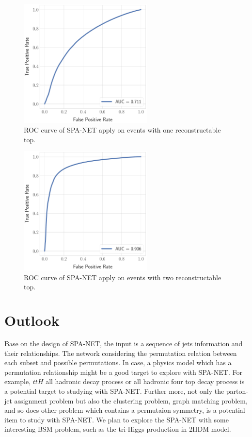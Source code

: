  \begin{figure}[H]
 	\centering
 	\includegraphics[width=0.6\textwidth]{Figures/roc_one_quark.pdf}
 	\caption{ ROC curve of SPA-NET apply on events with one reconstructable top.}
 	\label{fig: roc one top}
 \end{figure}
 \begin{figure}[H]
 	\centering
 	\includegraphics[width=0.6\textwidth]{Figures/roc_two_quark.pdf}
 	\caption{ ROC curve of SPA-NET apply on events with two reconstructable top.}
 	\label{fig: roc two top}
 \end{figure}

\section{Outlook}\label{sec:outlook}

Base on the design of SPA-NET, the input is a sequence of jets information and their relationships. The network considering the permutation relation between each subset and possible permutations. In case, a physics model which has a permutation relationship might be a good target to explore with SPA-NET. For example, $ttH$ all hadronic decay process or all hadronic four top decay process is a potential target to studying with SPA-NET. Further more, not only the parton-jet assignment problem but also the clustering problem, graph matching problem, and so does other problem which contains a permutaion symmetry, is a potential item to study with SPA-NET. We plan to explore the SPA-NET with some interesting BSM problem, such as the tri-Higgs production in 2HDM model.



